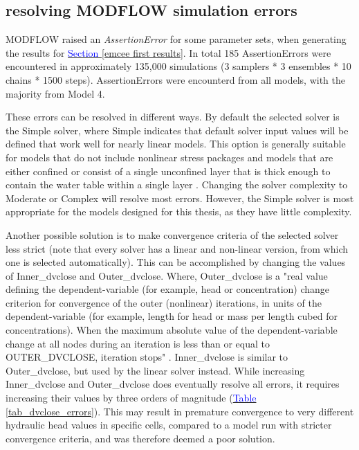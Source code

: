 \subsection{resolving MODFLOW simulation errors}\label{MODFLOW_ERRORS}
MODFLOW raised an \textit{AssertionError} for some parameter sets, when generating the results for \hyperref[emcee first results]{\textcolor{blue}{Section }\ref{emcee first results}}. In total 185 AssertionErrors were encountered in approximately 135,000 simulations (3 samplers * 3 ensembles * 10 chains * 1500 steps). AssertionErrors were encounterd from all models, with the majority from Model 4.  

These errors can be resolved in different ways. By default the selected solver is the Simple solver, where Simple indicates that default solver input values will be defined that work well for nearly linear models. This option is generally suitable for models that do not include nonlinear stress packages and models that are either confined or consist of a single unconfined layer that is thick enough to contain the water table within a single layer \cite{waterloo2024solver}. Changing the solver complexity to Moderate or Complex will resolve most errors. However, the Simple solver is most appropriate for the models designed for this thesis, as they have little complexity. 

Another possible solution is to make convergence criteria of the selected solver less strict (note that every solver has a linear and non-linear version, from which one is selected automatically). This can be accomplished by changing the values of Inner\_dvclose and Outer\_dvclose. Where, Outer\_dvclose is a "real value defining the dependent-variable (for example, head or concentration) change criterion for convergence of the outer (nonlinear) iterations, in units of the dependent-variable (for example, length for head or mass per length cubed for concentrations). When the maximum absolute value of the dependent-variable change at all nodes during an iteration is less than or equal to OUTER\_DVCLOSE, iteration stops" \cite{waterloo2024solver}. Inner\_dvclose is similar to Outer\_dvclose, but used by the linear solver instead. While increasing Inner\_dvclose and Outer\_dvclose does eventually resolve all errors, it requires increasing their values by three orders of magnitude (\hyperref[tab_dvclose_errors]{\textcolor{blue}{Table }\ref{tab_dvclose_errors}}). This may result in premature convergence to very different hydraulic head values in specific cells, compared to a model run with stricter convergence criteria, and was therefore deemed a poor solution. 

